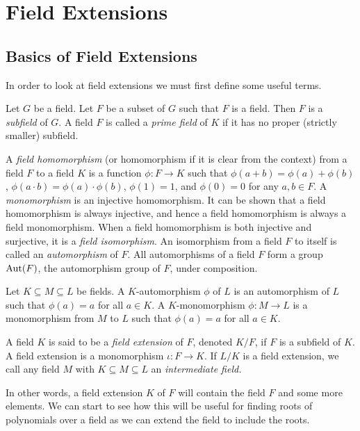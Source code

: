 \section{Field Extensions}

\subsection{Basics of Field Extensions}
In order to look at field extensions we must first define some useful terms.
\begin{definition}
Let $G$ be a field. Let \(F\) be a subset of \(G\) such that $F$ is a field. Then $F$ is a \textit{subfield}
 of $G$.
A field \(F\) is called a \textit{prime field} of \(K\) if it has no proper (strictly smaller) subfield.
\end{definition}
\begin{definition}
	A \textit{field homomorphism} (or homomorphism if it is clear from the context) from a field $F$ to a field $K$ is a function $\phi: F \to K$ such that $\phi(a + b) = \phi(a) + \phi(b)$, $\phi(a\cdot b) = \phi(a) \cdot \phi(b)$, $\phi(1) = 1$, and $\phi(0) = 0$ for any $a, b \in F$. 
    A \textit{monomorphism} is an injective homomorphism. It can be shown that a field homomorphism is always injective, and hence a field homomorphism is always a field monomorphism. 
	When a field homomorphism is both injective and surjective, it is a \textit{field isomorphism}. An isomorphism from a field $F$ to itself is called an \textit{automorphism} of $F$. All automorphisms of a field $F$ form a group $\operatorname{Aut}(F)$, the automorphism group of $F$, under composition. 
\end{definition}

\begin{definition} \label{def:automorphism}
	Let $K \subseteq M \subseteq L$ be fields. A $K$-automorphism $\phi$ of $L$ is an automorphism of $L$ such that $\phi(a) = a$ for all $a \in K$. 
	A $K$-monomorphism $\phi : M \to L$ is a monomorphism from $M$ to $L$ such that $\phi(a) = a$ for all $a \in K$. 
\end{definition}

\begin{definition}
A field \(K\) is said to be a \textit{field extension} of \(F\), denoted \(K / F\), if \(F\) is a subfield of \(K\). \cite{Moy} A field extension is a monomorphism \(\iota: F \to K\). If $L/K$ is a field extension, we call any field $M$ with $K \subseteq M \subseteq L$ an \textit{intermediate field.}
\end{definition}
In other words, a field extension \(K\) of \(F\) will contain the field \(F\) and some more elements. We can start to see how this will be useful for finding roots of polynomials over a field as we can extend the field to include the roots.

